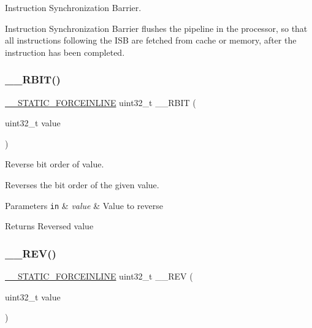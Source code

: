 Instruction Synchronization Barrier. 

Instruction Synchronization Barrier flushes the pipeline in the processor, so that all instructions following the I\+SB are fetched from cache or memory, after the instruction has been completed. \mbox{\label{group___c_m_s_i_s___core___instruction_interface_gaf944a7b7d8fd70164cca27669316bcf7}} 
\subsubsection{\texorpdfstring{\+\_\+\+\_\+\+R\+B\+I\+T()}{\_\_RBIT()}}
{\footnotesize\ttfamily \mbox{\hyperlink{cmsis__iccarm_8h_ab904513442afdf77d4f8c74f23cbb040}{\+\_\+\+\_\+\+S\+T\+A\+T\+I\+C\+\_\+\+F\+O\+R\+C\+E\+I\+N\+L\+I\+NE}} uint32\+\_\+t \+\_\+\+\_\+\+R\+B\+IT (\begin{DoxyParamCaption}\item[{uint32\+\_\+t}]{value }\end{DoxyParamCaption})}



Reverse bit order of value. 

Reverses the bit order of the given value. 
\begin{DoxyParams}[1]{Parameters}
\mbox{\tt in}  & {\em value} & Value to reverse \\
\hline
\end{DoxyParams}
\begin{DoxyReturn}{Returns}
Reversed value 
\end{DoxyReturn}
\mbox{\label{group___c_m_s_i_s___core___instruction_interface_gadb92679719950635fba8b1b954072695}} 
\subsubsection{\texorpdfstring{\+\_\+\+\_\+\+R\+E\+V()}{\_\_REV()}}
{\footnotesize\ttfamily \mbox{\hyperlink{cmsis__iccarm_8h_ab904513442afdf77d4f8c74f23cbb040}{\+\_\+\+\_\+\+S\+T\+A\+T\+I\+C\+\_\+\+F\+O\+R\+C\+E\+I\+N\+L\+I\+NE}} uint32\+\_\+t \+\_\+\+\_\+\+R\+EV (\begin{DoxyParamCaption}\item[{uint32\+\_\+t}]{value }\end{DoxyParamCaption})}



